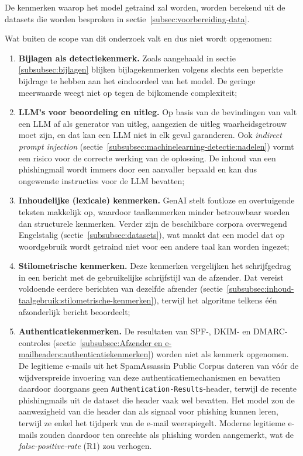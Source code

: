 De kenmerken waarop het model getraind zal worden, worden berekend uit de datasets die worden besproken in sectie~\ref{subsec:voorbereiding-data}. 

Wat buiten de scope van dit onderzoek valt en dus niet wordt opgenomen:
\begin{enumerate}
    \item \textbf{Bijlagen als detectiekenmerk.} Zoals aangehaald in sectie \ref{subsubsec:bijlagen} blijken bijlagekenmerken volgens \textcite{Mendes2025} slechts een beperkte bijdrage te hebben aan het eindoordeel van het model. De geringe meerwaarde weegt niet op tegen de bijkomende complexiteit;
    \item \textbf{LLM's voor beoordeling en uitleg.} Op basis van de bevindingen van \textcite{Turpin2023} valt een LLM af als generator van uitleg, aangezien de uitleg waarheidsgetrouw moet zijn, en dat kan een LLM niet in elk geval garanderen. Ook \emph{indirect prompt injection} \autocite{Greshake2023} (sectie~\ref{subsubsec:machinelearning-detectie:nadelen}) vormt een risico voor de correcte werking van de oplossing. De inhoud van een phishingmail wordt immers door een aanvaller bepaald en kan dus ongewenste instructies voor de LLM bevatten;
    \item \textbf{Inhoudelijke (lexicale) kenmerken.} GenAI stelt foutloze en overtuigende teksten makkelijk op, waardoor taalkenmerken minder betrouwbaar worden dan structurele kenmerken. Verder zijn de beschikbare corpora overwegend Engelstalig \autocite{Pajola2025} (sectie~\ref{subsubsec:datasets}), wat maakt dat een model dat op woordgebruik wordt getraind niet voor een andere taal kan worden ingezet;
    \item \textbf{Stilometrische kenmerken.} Deze kenmerken vergelijken het schrijfgedrag in een bericht met de gebruikelijke schrijfstijl van de afzender. Dat vereist voldoende eerdere berichten van dezelfde afzender \autocite{Stringhini2014} (sectie~\ref{subsubsec:inhoud-taalgebruik:stilometrische-kenmerken}), terwijl het algoritme telkens één afzonderlijk bericht beoordeelt;
    \item \textbf{Authenticatiekenmerken.} De resultaten van SPF-, DKIM- en DMARC-controles (sectie~\ref{subsubsec:Afzender en e-mailheaders:authenticatiekenmerken}) worden niet als kenmerk opgenomen. De legitieme e-mails uit het SpamAssassin Public Corpus dateren van vóór de wijdverspreide invoering van deze authenticatiemechanismen en bevatten daardoor doorgaans geen \texttt{Authentication-Results}-header, terwijl de recente phishingmails uit de dataset die header vaak wel bevatten. Het model zou de aanwezigheid van die header dan als signaal voor phishing kunnen leren, terwijl ze enkel het tijdperk van de e-mail weerspiegelt. Moderne legitieme e-mails zouden daardoor ten onrechte als phishing worden aangemerkt, wat de \emph{false-positive-rate} (R1) zou verhogen.
\end{enumerate}

